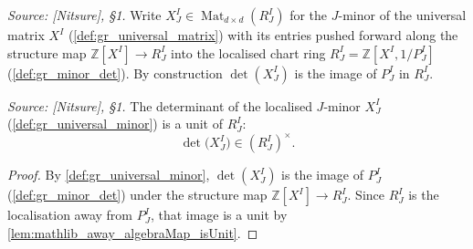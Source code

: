 \begin{definition}\leanok
  \label{def:gr_universal_minor}
  \textit{Source: [Nitsure], \S 1.}
  Write \(X^I_J \in \operatorname{Mat}_{d \times d}(R^I_J)\) for the \(J\)-minor of
  the universal matrix \(X^I\) (\cref{def:gr_universal_matrix}) with its entries
  pushed forward along the structure map \(\mathbb{Z}[X^I] \to R^I_J\) into the
  localised chart ring \(R^I_J = \mathbb{Z}[X^I, 1/P^I_J]\)
  (\cref{def:gr_minor_det}). By construction \(\det(X^I_J)\) is the image of
  \(P^I_J\) in \(R^I_J\).
\end{definition}

\begin{lemma}\leanok
  \label{lem:gr_minorDet_unit}
  \textit{Source: [Nitsure], \S 1.}
  The determinant of the localised \(J\)-minor \(X^I_J\)
  (\cref{def:gr_universal_minor}) is a unit of \(R^I_J\):
  \[
    \det\bigl(X^I_J\bigr) \in (R^I_J)^{\times}.
  \]
\end{lemma}
\begin{proof}
  \leanok
  By \cref{def:gr_universal_minor}, \(\det(X^I_J)\) is the image of \(P^I_J\)
  (\cref{def:gr_minor_det}) under the structure map
  \(\mathbb{Z}[X^I] \to R^I_J\). Since \(R^I_J\) is the localisation away from
  \(P^I_J\), that image is a unit by
  \cref{lem:mathlib_away_algebraMap_isUnit}.
\end{proof}

